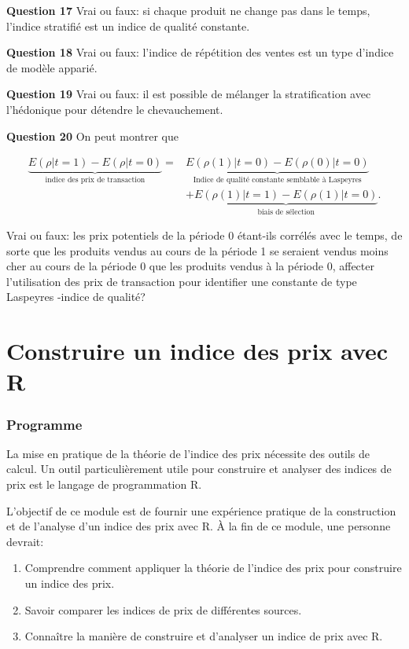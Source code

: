 \documentclass[]{article}
\providecommand{\tightlist}{%
  \setlength{\itemsep}{0pt}\setlength{\parskip}{0pt}}
\begin{document}
\textbf{Question 17} Vrai ou faux: si chaque produit ne change pas dans le temps, l'indice stratifié est un indice de qualité constante.

\textbf{Question 18} Vrai ou faux: l'indice de répétition des ventes est un type d'indice de modèle apparié.

\textbf{Question 19} Vrai ou faux: il est possible de mélanger la stratification avec l'hédonique pour détendre le chevauchement.

\textbf{Question 20} On peut montrer que

\begin{align*}
\underbrace{E(\rho | t = 1) - E(\rho | t = 0)}_{\text{indice des prix de transaction}} =& \underbrace{E(\rho(1) | t = 0 ) - E(\rho(0) | t = 0)}_{\text{Indice de qualité constante semblable à Laspeyres}} \\
& + \underbrace{E(\rho(1) | t = 1) - E(\rho(1) | t = 0)}_{\text{biais de sélection}}.
\end{align*}

Vrai ou faux: les prix potentiels de la période 0 étant-ils corrélés avec le temps, de sorte que les produits vendus au cours de la période 1 se seraient vendus moins cher au cours de la période 0 que les produits vendus à la période 0, affecter l'utilisation des prix de transaction pour identifier une constante de type Laspeyres -indice de qualité?

\hypertarget{part-construire-un-indice-des-prix-avec-r}{%
\part{Construire un indice des prix avec R}\label{part-construire-un-indice-des-prix-avec-r}}

\hypertarget{programme-3}{%
\section{Programme}\label{programme-3}}

La mise en pratique de la théorie de l'indice des prix nécessite des outils de calcul. Un outil particulièrement utile pour construire et analyser des indices de prix est le langage de programmation R.

L'objectif de ce module est de fournir une expérience pratique de la construction et de l'analyse d'un indice des prix avec R. À la fin de ce module, une personne devrait:

\begin{enumerate}
\def\labelenumi{\arabic{enumi}.}
\tightlist
\item
  Comprendre comment appliquer la théorie de l'indice des prix pour construire un indice des prix.
\item
  Savoir comparer les indices de prix de différentes sources.
\item
  Connaître la manière de construire et d'analyser un indice de prix avec R.
\end{enumerate}
\end{document}
